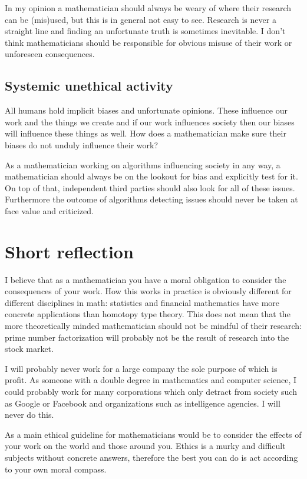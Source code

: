 \documentclass{article}
\begin{document}
In my opinion a mathematician should always be weary of where their research can
be (mis)used, but this is in general not easy to see. Research is never a
straight line and finding an unfortunate truth is sometimes inevitable. I don't
think mathematicians should be responsible for obvious misuse of their work or
unforeseen consequences.

\subsection*{Systemic unethical activity}
All humans hold implicit biases and unfortunate opinions. These influence our
work and the things we create and if our work influences society then our biases
will influence these things as well. How does a mathematician make sure their
biases do not unduly influence their work?

As a mathematician working on algorithms influencing society in any way, a
mathematician should always be on the lookout for bias and explicitly test for
it. On top of that, independent third parties should also look for all of these
issues. Furthermore the outcome of algorithms detecting issues should never be
taken at face value and criticized.

\section*{Short reflection}

I believe that as a mathematician you have a moral obligation to consider the
consequences of your work. How this works in practice is obviously different for
different disciplines in math: statistics and financial mathematics have more
concrete applications than homotopy type theory. This does not mean that the
more theoretically minded mathematician should not be mindful of their research:
prime number factorization will probably not be the result of research into the
stock market.

I will probably never work for a large company the sole purpose of which is
profit. As someone with a double degree in mathematics and computer science, I
could probably work for many corporations which only detract from society such
as Google or Facebook and organizations such as intelligence agencies. I will
never do this.

As a main ethical guideline for mathematicians would be to consider the effects
of your work on the world and those around you. Ethics is a murky and difficult
subjects without concrete answers, therefore the best you can do is act
according to your own moral compass.
\end{document}

